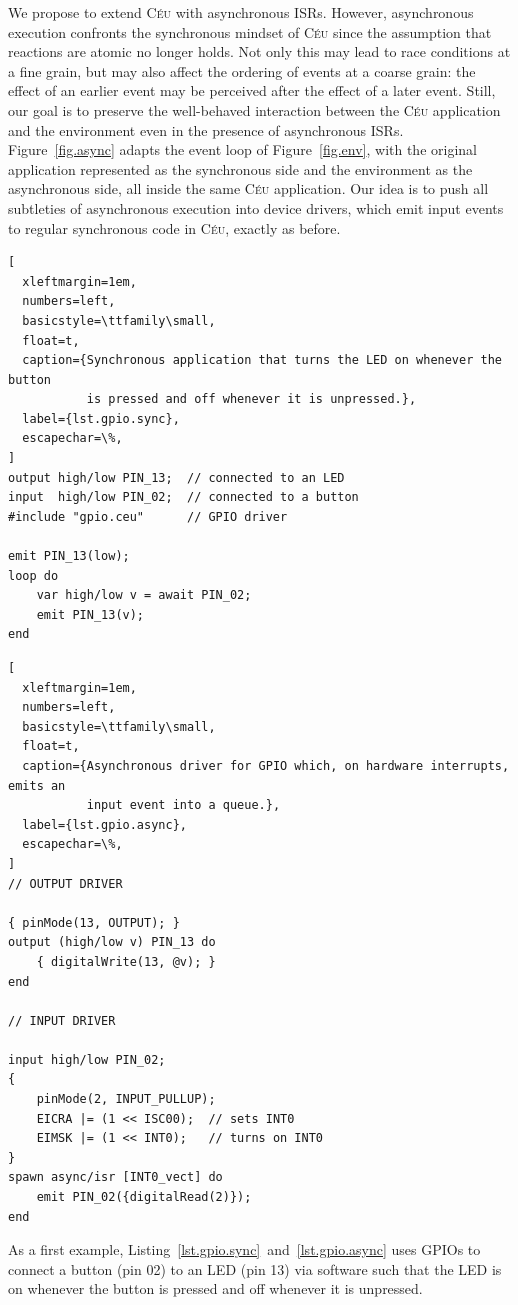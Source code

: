 \documentclass[sigplan,10pt,review,anonymous]{acmart}\settopmatter{printfolios=true,printccs=false,printacmref=false}
\newcommand{\CEU}{\textsc{C\'{e}u}\xspace}
\begin{document}
We propose to extend \CEU with asynchronous ISRs.
However, asynchronous execution confronts the synchronous mindset of \CEU since
the assumption that reactions are atomic no longer holds.
Not only this may lead to race conditions at a fine grain, but may also affect
the ordering of events at a coarse grain: the effect of an earlier event may be
perceived after the effect of a later event.
%
Still, our goal is to preserve the well-behaved interaction between the \CEU
application and the environment even in the presence of asynchronous ISRs.
Figure~\ref{fig.async} adapts the event loop of Figure~\ref{fig.env}, with the
original application represented as the synchronous side and the environment as
the asynchronous side, all inside the same \CEU application.
%
Our idea is to push all subtleties of asynchronous execution into device
drivers, which emit input events to regular synchronous code in \CEU, exactly
as before.

\begin{lstlisting}[
  xleftmargin=1em,
  numbers=left,
  basicstyle=\ttfamily\small,
  float=t,
  caption={Synchronous application that turns the LED on whenever the button
           is pressed and off whenever it is unpressed.},
  label={lst.gpio.sync},
  escapechar=\%,
]
output high/low PIN_13;  // connected to an LED
input  high/low PIN_02;  // connected to a button
#include "gpio.ceu"      // GPIO driver

emit PIN_13(low);
loop do
    var high/low v = await PIN_02;
    emit PIN_13(v);
end
\end{lstlisting}

\begin{lstlisting}[
  xleftmargin=1em,
  numbers=left,
  basicstyle=\ttfamily\small,
  float=t,
  caption={Asynchronous driver for GPIO which, on hardware interrupts, emits an
           input event into a queue.},
  label={lst.gpio.async},
  escapechar=\%,
]
// OUTPUT DRIVER

{ pinMode(13, OUTPUT); }
output (high/low v) PIN_13 do
    { digitalWrite(13, @v); }
end

// INPUT DRIVER

input high/low PIN_02;
{
    pinMode(2, INPUT_PULLUP);
    EICRA |= (1 << ISC00);  // sets INT0
    EIMSK |= (1 << INT0);   // turns on INT0
}
spawn async/isr [INT0_vect] do
    emit PIN_02({digitalRead(2)});
end
\end{lstlisting}

As a first example, Listing~\ref{lst.gpio.sync}~and~\ref{lst.gpio.async} uses
GPIOs to connect a button (pin 02) to an LED (pin 13) via software such that
the LED is on whenever the button is pressed and off whenever it is unpressed.
\end{document}

